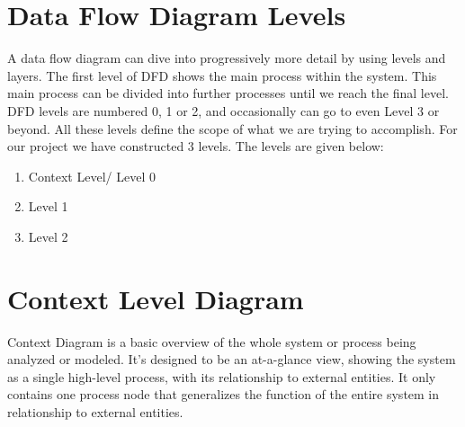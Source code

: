 \noindent 

\section{Data Flow Diagram Levels}

\noindent A data flow diagram can dive into progressively more detail by using levels and layers. The first level of DFD shows the main process within the system. This main process can be divided into further processes until we reach the final level. DFD levels are numbered 0, 1 or 2, and occasionally can go to even Level 3 or beyond. All these levels define the scope of what we are trying to accomplish. For our project we have constructed 3 levels. The levels are given below:

\begin{enumerate}
\item  Context Level/ Level 0

\item  Level 1

\item  Level 2
\end{enumerate}

\noindent 



\section{Context Level Diagram}

\noindent Context Diagram is a basic overview of the whole system or process being analyzed or modeled. It’s designed to be an at-a-glance view, showing the system as a single high-level process, with its relationship to external entities. It only contains one process node that generalizes the function of the entire system in relationship to external entities.


